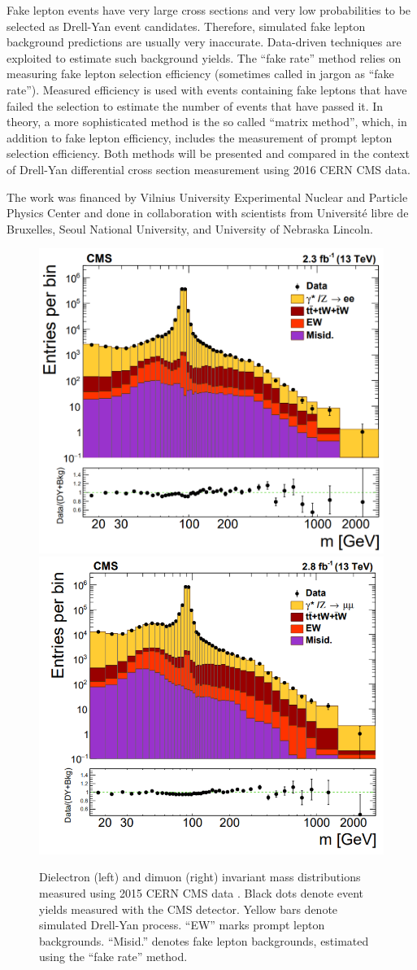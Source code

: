 \documentclass[a4paper,10pt,english]{article}
\begin{document}
Fake lepton events have very large cross sections and very low probabilities to be selected as Drell-Yan event candidates.
Therefore, simulated fake lepton background predictions are usually very inaccurate.
Data-driven techniques are exploited to estimate such background yields.
The ``fake rate'' method relies on measuring fake lepton selection efficiency (sometimes called in jargon as ``fake rate'').
Measured efficiency is used with events containing fake leptons that have failed the selection to estimate the number of
events that have passed it.
In theory, a more sophisticated method is the so called ``matrix method'', which, in addition to fake lepton efficiency,
includes the measurement of prompt lepton selection efficiency.
Both methods will be presented and compared in the context of Drell-Yan differential cross section measurement using
2016 CERN CMS data.

The work was financed by Vilnius University Experimental Nuclear and Particle Physics Center and done in collaboration with
scientists from Universit\'{e} libre de Bruxelles, Seoul National University, and University of Nebraska Lincoln.
 
\vspace{-0.3cm}
\begin{figure}[H]
	\includegraphics[width=.4\linewidth]{Figure1.png}
	\includegraphics[width=.4\linewidth]{Figure2.png}
\vspace{-0.2cm}
\caption{Dielectron (left) and dimuon (right) invariant mass distributions measured using 2015 CERN CMS data \cite{DY13}.
      Black dots denote event yields measured with the CMS detector.    
      Yellow bars denote simulated Drell-Yan process.
      ``EW'' marks prompt lepton backgrounds.
      ``Misid.'' denotes fake lepton backgrounds, estimated using the ``fake rate'' method.}
\end{figure}
\end{document}
